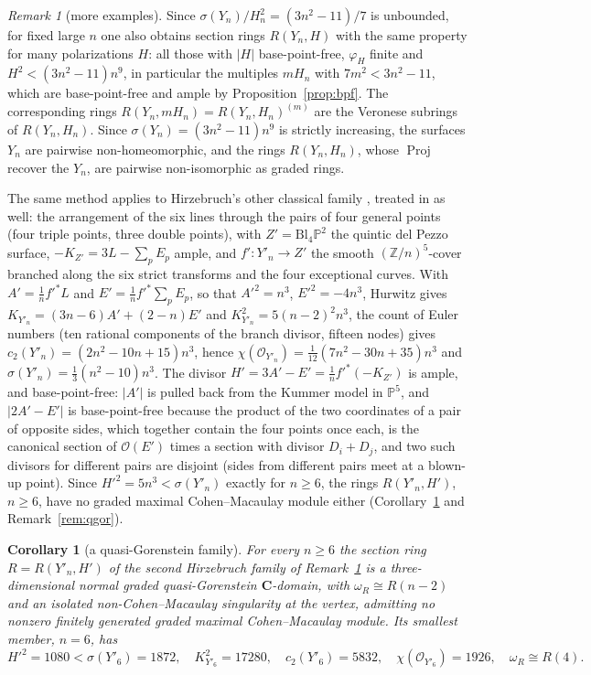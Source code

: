 \documentclass[11pt]{amsart}
\newtheorem{corollary}[theorem]{Corollary}
\theoremstyle{remark}
\newtheorem{remark}[theorem]{Remark}
\theoremstyle{definition}
\newcommand{\PP}{\mathbb{P}}
\newcommand{\ZZ}{\mathbb{Z}}
\newcommand{\CC}{\mathbf{C}}
\newcommand{\cO}{\mathcal{O}}
\DeclareMathOperator{\Proj}{Proj}
\begin{document}
\begin{remark}[more examples]\label{rem:more}
Since $\sigma(Y_n)/H_n^2=(3n^2-11)/7$ is unbounded, for fixed large $n$ one also obtains section rings $R(Y_n,H)$ with the same property for many polarizations $H$: all those with $|H|$ base-point-free, $\varphi_H$ finite and $H^2<(3n^2-11)n^9$, in particular the multiples $mH_n$ with $7m^2<3n^2-11$, which are base-point-free and ample by Proposition~\ref{prop:bpf}. The corresponding rings $R(Y_n,mH_n)=R(Y_n,H_n)^{(m)}$ are the Veronese subrings of $R(Y_n,H_n)$. Since $\sigma(Y_n)=(3n^2-11)n^9$ is strictly increasing, the surfaces $Y_n$ are pairwise non-homeomorphic, and the rings $R(Y_n,H_n)$, whose $\Proj$ recover the $Y_n$, are pairwise non-isomorphic as graded rings.

The same method applies to Hirzebruch's other classical family \cite{Hi}, treated in \cite{An} as well: the arrangement of the six lines through the pairs of four general points (four triple points, three double points), with $Z'=\mathrm{Bl}_4\PP^2$ the quintic del Pezzo surface, $-K_{Z'}=3L-\sum_pE_p$ ample, and $f'\colon Y'_n\to Z'$ the smooth $(\ZZ/n)^5$-cover branched along the six strict transforms and the four exceptional curves. With $A'=\tfrac1nf'^*L$ and $E'=\tfrac1nf'^*\sum_pE_p$, so that $A'^2=n^3$, $E'^2=-4n^3$, Hurwitz gives $K_{Y'_n}=(3n-6)A'+(2-n)E'$ and $K_{Y'_n}^2=5(n-2)^2n^3$, the count of Euler numbers (ten rational components of the branch divisor, fifteen nodes) gives $c_2(Y'_n)=(2n^2-10n+15)n^3$, hence $\chi(\cO_{Y'_n})=\tfrac1{12}(7n^2-30n+35)n^3$ and $\sigma(Y'_n)=\tfrac13(n^2-10)n^3$. The divisor $H'=3A'-E'=\tfrac1nf'^*(-K_{Z'})$ is ample, and base-point-free: $|A'|$ is pulled back from the Kummer model in $\PP^5$, and $|2A'-E'|$ is base-point-free because the product of the two coordinates of a pair of opposite sides, which together contain the four points once each, is the canonical section of $\cO(E')$ times a section with divisor $D_i+D_j$, and two such divisors for different pairs are disjoint (sides from different pairs meet at a blown-up point). Since $H'^2=5n^3<\sigma(Y'_n)$ exactly for $n\ge6$, the rings $R(Y'_n,H')$, $n\ge6$, have no graded maximal Cohen--Macaulay module either (Corollary~\ref{cor:qgor} and Remark~\ref{rem:qgor}).
\end{remark}

\begin{corollary}[a quasi-Gorenstein family]\label{cor:qgor}
For every $n\ge6$ the section ring $R=R(Y'_n,H')$ of the second Hirzebruch family of Remark~\textup{\ref{rem:more}} is a three-dimensional normal graded \emph{quasi-Gorenstein} $\CC$-domain, with $\omega_R\cong R(n-2)$ and an isolated non-Cohen--Macaulay singularity at the vertex, admitting no nonzero finitely generated graded maximal Cohen--Macaulay module. Its smallest member, $n=6$, has
\[
H'^2=1080<\sigma(Y'_6)=1872,\quad K_{Y'_6}^2=17280,\quad c_2(Y'_6)=5832,\quad \chi(\cO_{Y'_6})=1926,\quad \omega_R\cong R(4).
\]
\end{corollary}
\end{document}
